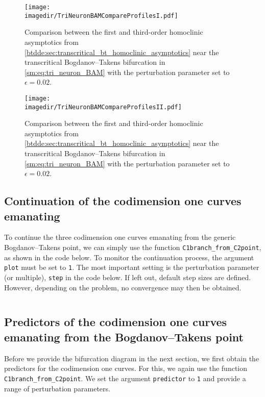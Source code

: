 \begin{figure}[ht]
    \centering
    \texttt{[image: \\imagedir/TriNeuronBAMCompareProfilesI.pdf]}
    \caption{Comparison between the first and third-order homoclinic asymptotics from
    \cref{btdde:sec:transcritical_bt_homoclinic_asymptotics} near the transcritical
        Bogdanov--Takens bifurcation in \cref{sm:eq:tri_neuron_BAM} with the
        perturbation parameter set to $\epsilon=0.02$.}
        \label{sm:fig:TriNeuronBAMCompareProfilesI}
\end{figure}

\begin{figure}[ht]
    \centering
    \texttt{[image: \\imagedir/TriNeuronBAMCompareProfilesII.pdf]}
    \caption{Comparison between the first and third-order homoclinic asymptotics from
    \cref{btdde:sec:transcritical_bt_homoclinic_asymptotics} near the transcritical
        Bogdanov--Takens bifurcation in \cref{sm:eq:tri_neuron_BAM} with the
        perturbation parameter set to $\epsilon=0.02$.}
        \label{sm:fig:TriNeuronBAMCompareProfilesII}
\end{figure}

\subsection{Continuation of the codimension one curves emanating}
To continue the three codimension one curves emanating from the generic
Bogdanov--Takens point, we can simply use the function
\texttt{C1branch_from_C2point}, as shown in the code below. To monitor the
continuation process, the argument \texttt{plot} must be set to \texttt{1}.
The most important setting is the perturbation parameter (or multiple),
\texttt{step} in the code below. If left out, default step sizes are defined.
However, depending on the problem, no convergence may then be obtained.
\inputminted[firstline=83, lastline=103]{MATLAB}{\pathToDDEBifToolDemos/BAM_neural_network_model/BAMnn.m}

\subsection{Predictors of the codimension one curves emanating from the Bogdanov--Takens point}
Before we provide the bifurcation diagram in the next section, we first obtain the predictors
for the codimension one curves. For this, we again use the function
\texttt{C1branch_from_C2point}. We set the argument \texttt{predictor} to \texttt{1}
and provide a range of perturbation parameters.
\inputminted[firstline=127, lastline=146]{MATLAB}{\pathToDDEBifToolDemos/BAM_neural_network_model/BAMnn.m}

